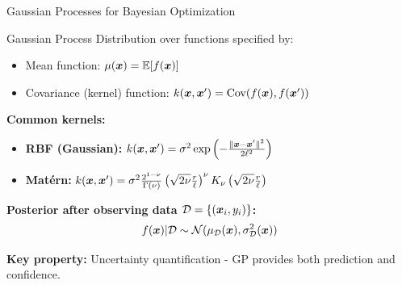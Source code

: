 \documentclass[aspectratio=169]{beamer}
\begin{document}
\begin{frame}{Gaussian Processes for Bayesian Optimization}
  \begin{definitionbox}{Gaussian Process}
    Distribution over functions specified by:
    \begin{itemize}
      \item Mean function: $\mu(\boldsymbol{x}) = \mathbb{E}[f(\boldsymbol{x})]$
      \item Covariance (kernel) function: $k(\boldsymbol{x}, \boldsymbol{x}') = \text{Cov}(f(\boldsymbol{x}), f(\boldsymbol{x}'))$
    \end{itemize}
  \end{definitionbox}

  \vspace{0.5em}

  \textbf{Common kernels:}
  \begin{itemize}
    \item \textbf{RBF (Gaussian):} $k(\boldsymbol{x}, \boldsymbol{x}') = \sigma^2 \exp\left(-\frac{\|\boldsymbol{x} - \boldsymbol{x}'\|^2}{2\ell^2}\right)$
    \item \textbf{Matérn:} $k(\boldsymbol{x}, \boldsymbol{x}') = \sigma^2 \frac{2^{1-\nu}}{\Gamma(\nu)} \left(\sqrt{2\nu}\frac{r}{\ell}\right)^\nu K_\nu\left(\sqrt{2\nu}\frac{r}{\ell}\right)$
  \end{itemize}

  \vspace{0.5em}

  \textbf{Posterior after observing data $\mathcal{D} = \{(\boldsymbol{x}_i, y_i)\}$:}
  $$f(\boldsymbol{x}) | \mathcal{D} \sim \mathcal{N}(\mu_{\mathcal{D}}(\boldsymbol{x}), \sigma_{\mathcal{D}}^2(\boldsymbol{x}))$$

  \vspace{0.5em}

  \textbf{Key property:} Uncertainty quantification - GP provides both prediction and confidence.
\end{frame}
\end{document}
